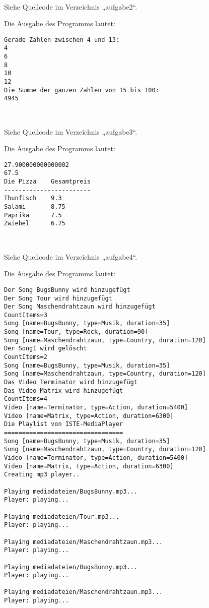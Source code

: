 \documentclass{mywork}
\begin{document}
\setcounter{aufgabe}{1}

\begin{aufgabe}~

	Siehe Quellcode im Verzeichnis „aufgabe2“.

	Die Ausgabe des Programms lautet:
	\begin{verbatim}
Gerade Zahlen zwischen 4 und 13:
4
6
8
10
12
Die Summe der ganzen Zahlen von 15 bis 100:
4945
	\end{verbatim}
\end{aufgabe}

\begin{aufgabe}~

	Siehe Quellcode im Verzeichnis „aufgabe3“.

	Die Ausgabe des Programms lautet:
	\begin{verbatim}
27.900000000000002
67.5
Die Pizza    Gesamtpreis
------------------------
Thunfisch    9.3
Salami       8.75
Paprika      7.5
Zwiebel      6.75

	\end{verbatim}
\end{aufgabe}

\begin{aufgabe}~

	Siehe Quellcode im Verzeichnis „aufgabe4“.

	Die Ausgabe des Programms lautet:
	\begin{verbatim}
Der Song BugsBunny wird hinzugefügt
Der Song Tour wird hinzugefügt
Der Song Maschendrahtzaun wird hinzugefügt
CountItems=3
Song [name=BugsBunny, type=Musik, duration=35]
Song [name=Tour, type=Rock, duration=90]
Song [name=Maschendrahtzaun, type=Country, duration=120]
Der Song1 wird gelöscht
CountItems=2
Song [name=BugsBunny, type=Musik, duration=35]
Song [name=Maschendrahtzaun, type=Country, duration=120]
Das Video Terminator wird hinzugefügt
Das Video Matrix wird hinzugefügt
CountItems=4
Video [name=Terminator, type=Action, duration=5400]
Video [name=Matrix, type=Action, duration=6300]
Die Playlist von ISTE-MediaPlayer
=================================
Song [name=BugsBunny, type=Musik, duration=35]
Song [name=Maschendrahtzaun, type=Country, duration=120]
Video [name=Terminator, type=Action, duration=5400]
Video [name=Matrix, type=Action, duration=6300]
Creating mp3 player..

Playing mediadateien/BugsBunny.mp3...
Player: playing...

Playing mediadateien/Tour.mp3...
Player: playing...

Playing mediadateien/Maschendrahtzaun.mp3...
Player: playing...

Playing mediadateien/BugsBunny.mp3...
Player: playing...

Playing mediadateien/Maschendrahtzaun.mp3...
Player: playing...
	\end{verbatim}
\end{aufgabe}
\end{document}

